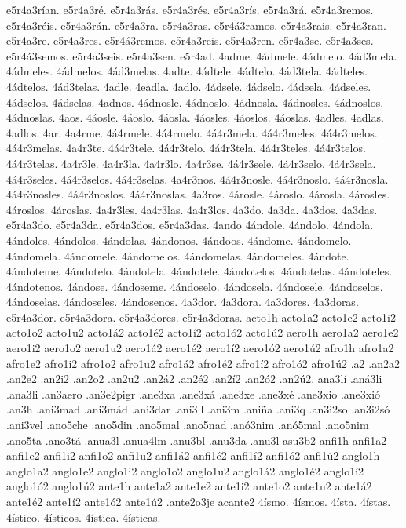 {e5r4a3rían.
e5r4a3ré.
e5r4a3rás.
e5r4a3rés.
e5r4a3rís.
e5r4a3rá.
e5r4a3remos.
e5r4a3réis.
e5r4a3rán.
e5r4a3ra.
e5r4a3ras.
e5r4á3ramos.
e5r4a3rais.
e5r4a3ran.
e5r4a3re.
e5r4a3res.
e5r4á3remos.
e5r4a3reis.
e5r4a3ren.
e5r4a3se.
e5r4a3ses.
e5r4á3semos.
e5r4a3seis.
e5r4a3sen.
e5r4ad.
4adme.
4ádmele.
4ádmelo.
4ád3mela.
4ádmeles.
4ádmelos.
4ád3melas.
4adte.
4ádtele.
4ádtelo.
4ád3tela.
4ádteles.
4ádtelos.
4ád3telas.
4adle.
4eadla.
4adlo.
4ádsele.
4ádselo.
4ádsela.
4ádseles.
4ádselos.
4ádselas.
4adnos.
4ádnosle.
4ádnoslo.
4ádnosla.
4ádnosles.
4ádnoslos.
4ádnoslas.
4aos.
4áosle.
4áoslo.
4áosla.
4áosles.
4áoslos.
4áoslas.
4adles.
4adlas.
4adlos.
4ar.
4a4rme.
4á4rmele.
4á4rmelo.
4á4r3mela.
4á4r3meles.
4á4r3melos.
4á4r3melas.
4a4r3te.
4á4r3tele.
4á4r3telo.
4á4r3tela.
4á4r3teles.
4á4r3telos.
4á4r3telas.
4a4r3le.
4a4r3la.
4a4r3lo.
4a4r3se.
4á4r3sele.
4á4r3selo.
4á4r3sela.
4á4r3seles.
4á4r3selos.
4á4r3selas.
4a4r3nos.
4á4r3nosle.
4á4r3noslo.
4á4r3nosla.
4á4r3nosles.
4á4r3noslos.
4á4r3noslas.
4a3ros.
4árosle.
4ároslo.
4árosla.
4árosles.
4ároslos.
4ároslas.
4a4r3les.
4a4r3las.
4a4r3los.
4a3do.
4a3da.
4a3dos.
4a3das.
e5r4a3do.
e5r4a3da.
e5r4a3dos.
e5r4a3das.
4ando
4ándole.
4ándolo.
4ándola.
4ándoles.
4ándolos.
4ándolas.
4ándonos.
4ándoos.
4ándome.
4ándomelo.
4ándomela.
4ándomele.
4ándomelos.
4ándomelas.
4ándomeles.
4ándote.
4ándoteme.
4ándotelo.
4ándotela.
4ándotele.
4ándotelos.
4ándotelas.
4ándoteles.
4ándotenos.
4ándose.
4ándoseme.
4ándoselo.
4ándosela.
4ándosele.
4ándoselos.
4ándoselas.
4ándoseles.
4ándosenos.
4a3dor.
4a3dora.
4a3dores.
4a3doras.
e5r4a3dor.
e5r4a3dora.
e5r4a3dores.
e5r4a3doras.
acto1h
acto1a2 acto1e2 acto1i2 acto1o2 acto1u2
acto1á2 acto1é2 acto1í2 acto1ó2 acto1ú2
aero1h
aero1a2 aero1e2 aero1i2 aero1o2 aero1u2
aero1á2 aero1é2 aero1í2 aero1ó2 aero1ú2
afro1h
afro1a2 afro1e2 afro1i2 afro1o2 afro1u2
afro1á2 afro1é2 afro1í2 afro1ó2 afro1ú2
.a2
.an2a2
.an2e2
.an2i2
.an2o2
.an2u2
.an2á2
.an2é2
.an2í2
.an2ó2
.an2ú2.
ana3lí
.aná3li
.ana3li
.an3aero
.an3e2pigr
.ane3xa
.ane3xá
.ane3xe
.ane3xé
.ane3xio
.ane3xió
.an3h
.ani3mad
.ani3mád
.ani3dar
.ani3ll
.ani3m
.aniña
.ani3q
.an3i2so
.an3i2só
.ani3vel
.ano5che
.ano5din
.ano5mal
.ano5nad
.anó3nim
.anó5mal
.ano5nim
.ano5ta
.ano3tá
.anua3l
.anua4lm
.anu3bl
.anu3da
.anu3l
asu3b2
anfi1h
anfi1a2 anfi1e2 anfi1i2 anfi1o2 anfi1u2
anfi1á2 anfi1é2 anfi1í2 anfi1ó2 anfi1ú2
anglo1h
anglo1a2 anglo1e2 anglo1i2 anglo1o2 anglo1u2
anglo1á2 anglo1é2 anglo1í2 anglo1ó2 anglo1ú2
ante1h
ante1a2 ante1e2 ante1i2 ante1o2 ante1u2
ante1á2 ante1é2 ante1í2 ante1ó2 ante1ú2
.ante2o3je
acante2
4ísmo.
4ísmos.
4ísta.
4ístas.
4ístico.
4ísticos.
4ística.
4ísticas.
}
